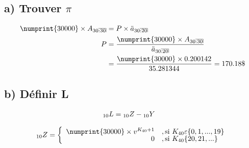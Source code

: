 \documentclass[11pt,french]{report}
\makeatletter
\DeclareRobustCommand{\annuity}[1]{%
\def\arraystretch{0}%
\setlength\arraycolsep{.7pt}%
\setlength\arrayrulewidth{.3pt}%
\begin{array}[b]{@{}c|}\hline
\\[\arraycolsep]%
\scriptstyle #1%
\end{array}%
}
\newcommand{\indiceGauche}[2]{{\vphantom{#2}}_{#1}#2}
\makeatother
\begin{document}
\subsection*{a) Trouver $\pi$} 
\begin{align*}
\numprint{30000} \times A_{30\annuity{:30}} &= P \times \ddot{a}_{30\annuity{:20}} \\
P &= \frac{\numprint{30000} \times A_{30\annuity{:30}}}{\ddot{a}_{30\annuity{:20}}} \\
&= \frac{\numprint{30000} \times 0.200142}{35.281344} = 170.18\$ \\
\end{align*}

\subsection*{b) Définir L}
\begin{align*}
\indiceGauche{10}{L} &= \indiceGauche{10}{Z} - \indiceGauche{10}{Y}
\end{align*}

\begin{equation}
\label{eq:exp:z2}
\indiceGauche{10}{Z} =
     	\left\{
     	\begin{array}{rl}
     	\numprint{30000}\times v^{K_{40}+1} &, \text{si } K_{40} \varepsilon \lbrace 0,1,..., 19\rbrace\\
		0 &, \text{si } K_{40} \lbrace 20,21,...\rbrace
     	\end{array}
     	\right.	
\end{equation}
\end{document}
